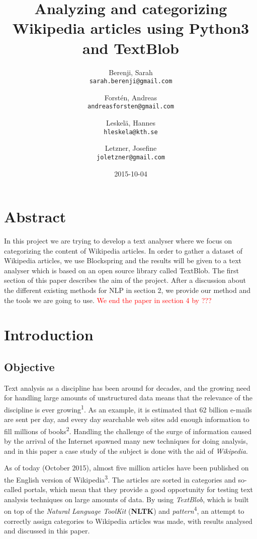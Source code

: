 \documentclass[a4paper]{article}
\title{Analyzing and categorizing Wikipedia articles using Python3 and TextBlob}
\author{
  Berenji, Sarah\\
  \texttt{sarah.berenji@gmail.com}
  \and
  Forstén, Andreas\\
  \texttt{andreasforsten@gmail.com}
  \and
  Leskelä, Hannes\\
  \texttt{hleskela@kth.se}
  \and
  Letzner, Josefine\\
    \texttt{joletzner@gmail.com}
}
\date{2015-10-04}
\begin{document}
\maketitle
\section*{Abstract}
In this project we are trying to develop a text analyser where we focus on categorizing the content of Wikipedia articles. In order to gather a dataset of Wikipedia articles, we use Blockspring and the results will be given to a text analyser which is based on an open source library called TextBlob. The first section of this paper describes the aim of the project. After a discussion about the different existing methods for NLP in section 2, we provide our method and the tools we are going to use. \textcolor{red}{ We end the paper in section 4 by ???}


\newpage
\tableofcontents
\newpage

\section{Introduction}


\vspace{3mm}

\subsection{Objective}

Text analysis as a discipline has been around for decades, and the growing need for handling large amounts of unstructured data means that the relevance of the discipline is ever growing\textsuperscript{1}. As an example, it is estimated that 62 billion e-mails are sent per day, and every day searchable web sites add enough information to fill millions of books\textsuperscript{2}.  Handling the challenge of the surge of information caused by the arrival of the Internet spawned many new techniques for doing analysis, and in this paper a case study of the subject is done with the aid of \textit{Wikipedia}. 

\vspace{3mm}

As of today (October 2015), almost five million articles have been published on the English version of Wikipedia\textsuperscript{3}. The articles are sorted in categories and so-called portals, which mean that they provide a good opportunity for testing text analysis techniques on large amounts of data. By using \textit{TextBlob}, which is built on top of the \textit{Natural Language ToolKit} (\textbf{NLTK}) and \textit{pattern}\textsuperscript{4}, an attempt to correctly assign categories to Wikipedia articles was made, with results analysed and discussed in this paper. 
\end{document}
